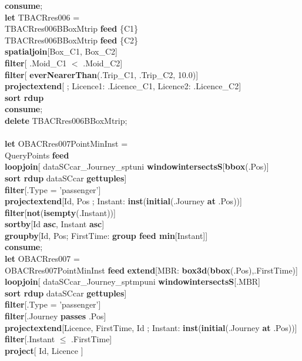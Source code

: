 \documentclass[a4paper]{article}
\newcommand{\op}[1]{\textbf{#1}}
\begin{document}
\begin{scriptsize}
\begin{tabbing}
\op{consume};\\
\op{let} TBACRres006 =\\
\>TBACRres006BBoxMtrip \op{feed} \{C1\}\\
\>TBACRres006BBoxMtrip \op{feed} \{C2\}\\
\>\op{spatialjoin}[Box\_C1, Box\_C2]\\
\>\op{filter}[ .Moid\_C1 $<$ .Moid\_C2]\\
\>\op{filter}[ \op{everNearerThan}(.Trip\_C1, .Trip\_C2, 10.0)]\\
\>\op{projectextend}[ ; Licence1: .Licence\_C1, Licence2: .Licence\_C2]\\
\>\op{sort rdup}\\
\op{consume};\\
\op{delete} TBACRres006BBoxMtrip;\\
\\
\op{let} OBACRres007PointMinInst = \\
\>QueryPoints \op{feed}\\
\>\op{loopjoin}[ dataSCcar\_Journey\_sptuni \op{windowintersectsS}[\op{bbox}(.Pos)]\\
\>\>\op{sort rdup} dataSCcar \op{gettuples}]\\
\>\op{filter}[.Type = 'passenger']\\
\>\op{projectextend}[Id, Pos ; Instant: \op{inst}(\op{initial}(.Journey \op{at} .Pos))]\\
\>\op{filter}[\op{not}(\op{isempty}(.Instant))]\\
\>\op{sortby}[Id \op{asc}, Instant \op{asc}]\\
\>\op{groupby}[Id, Pos; FirstTime: \op{group feed min}[Instant]]\\
\op{consume};\\
\op{let} OBACRres007 =\\
\>OBACRres007PointMinInst \op{feed} \op{extend}[MBR: \op{box3d}(\op{bbox}(.Pos),.FirstTime)]\\
\>\op{loopjoin}[ dataSCcar\_Journey\_sptmpuni \op{windowintersectsS}[.MBR]\\
\>\>\op{sort rdup} dataSCcar \op{gettuples}]\\
\>\op{filter}[.Type = 'passenger']\\
\>\op{filter}[.Journey \op{passes} .Pos]\\
\>\op{projectextend}[Licence, FirstTime, Id ; Instant: \op{inst}(\op{initial}(.Journey \op{at} .Pos))]\\
\>\op{filter}[.Instant $\leq$ .FirstTime]\\
\>\op{project}[ Id, Licence ]\\

\end{tabbing}
\end{scriptsize}
\end{document}
